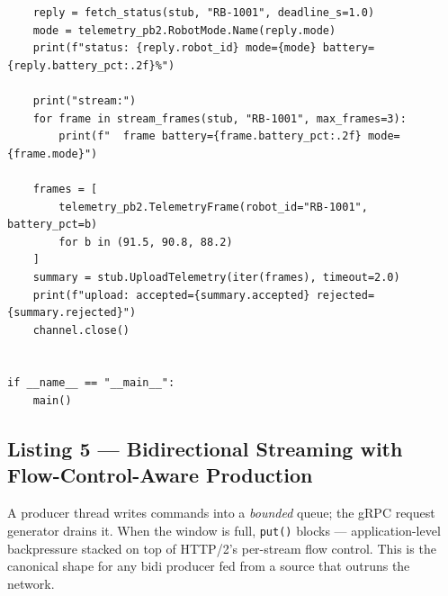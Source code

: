 \begin{verbatim}
    reply = fetch_status(stub, "RB-1001", deadline_s=1.0)
    mode = telemetry_pb2.RobotMode.Name(reply.mode)
    print(f"status: {reply.robot_id} mode={mode} battery={reply.battery_pct:.2f}%")

    print("stream:")
    for frame in stream_frames(stub, "RB-1001", max_frames=3):
        print(f"  frame battery={frame.battery_pct:.2f} mode={frame.mode}")

    frames = [
        telemetry_pb2.TelemetryFrame(robot_id="RB-1001", battery_pct=b)
        for b in (91.5, 90.8, 88.2)
    ]
    summary = stub.UploadTelemetry(iter(frames), timeout=2.0)
    print(f"upload: accepted={summary.accepted} rejected={summary.rejected}")
    channel.close()


if __name__ == "__main__":
    main()
\end{verbatim}

\subsection{Listing 5 --- Bidirectional Streaming with Flow-Control-Aware Production}
\label{subsec:ch13-code-bidi}

A producer thread writes commands into a \emph{bounded} queue; the gRPC request
generator drains it. When the window is full, \texttt{put()} blocks ---
application-level backpressure stacked on top of HTTP/2's per-stream flow
control. This is the canonical shape for any bidi producer fed from a source
that outruns the network.

